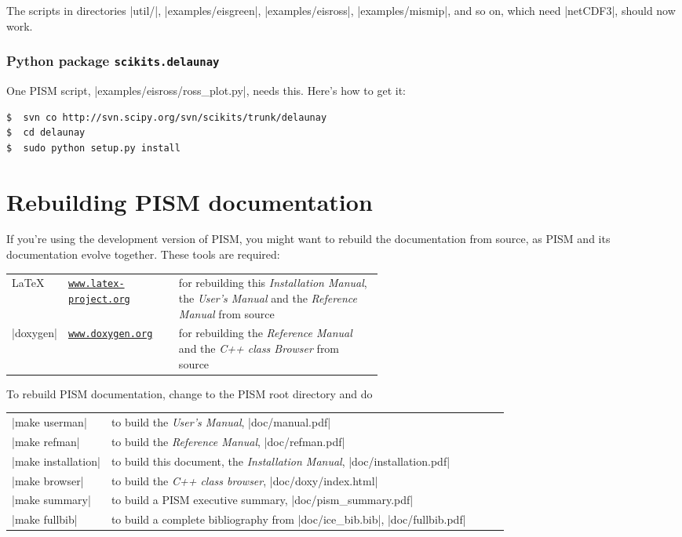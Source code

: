\documentclass[11pt,final]{amsart}
\renewcommand{\t}[1]{\texttt{#1}}
\begin{document}
The scripts in directories |util/|, |examples/eisgreen|, |examples/eisross|, |examples/mismip|, and so on, which need |netCDF3|, should now work.


\subsubsection*{Python package \texttt{scikits.delaunay}}  One PISM script, |examples/eisross/ross_plot.py|, needs this.  Here's how to get it:
\begin{verbatim}
$  svn co http://svn.scipy.org/svn/scikits/trunk/delaunay
$  cd delaunay
$  sudo python setup.py install
\end{verbatim}


\newpage
\section{Rebuilding PISM documentation}
\label{sec:docs}

If you're using the development version of PISM, you might want to rebuild the documentation from source, as PISM and its documentation evolve together.  These tools are required:
\bigskip
\begin{center}
  \begin{tabular*}{0.9\linewidth}{llp{0.55\linewidth}}
    \hline
    \LaTeX & \href{http://www.latex-project.org/}{\t{www.latex-project.org}} &  for rebuilding this \emph{Installation Manual}, the \emph{User's Manual} and the \emph{Reference Manual} from source\\
    |doxygen|\index{doxygen} & \href{http://www.stack.nl/~dimitri/doxygen/}{\t{www.doxygen.org}} &  for rebuilding the \emph{Reference Manual} and the \emph{C++ class Browser} from source  \\
    \hline
  \end{tabular*}
\end{center}
\bigskip
\noindent To rebuild PISM documentation, change to the PISM root directory and do
\begin{center}
  \begin{tabular*}{0.9\linewidth}{lp{0.8\linewidth}}
    |make userman| & to build the \emph{User's Manual}, |doc/manual.pdf|\\
    |make refman| & to build the \emph{Reference Manual}, |doc/refman.pdf|\\
    |make installation| & to build this document, the \emph{Installation Manual}, |doc/installation.pdf|\\
    |make browser| & to build the \emph{C++ class browser}, |doc/doxy/index.html|\\
    |make summary| & to build a PISM executive summary, |doc/pism_summary.pdf|\\
    |make fullbib| & to build  a complete bibliography from |doc/ice_bib.bib|, |doc/fullbib.pdf|
  \end{tabular*}
\end{center}
\end{document}
